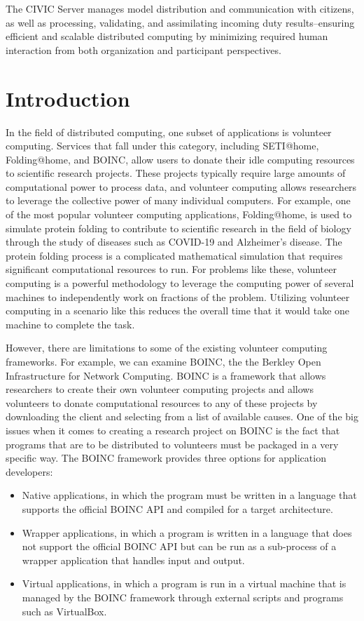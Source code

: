 \documentclass[11pt]{article}
\begin{document}
The CIVIC Server manages model distribution and communication with citizens, as well as processing, validating, and assimilating incoming duty results--ensuring efficient and scalable distributed computing by minimizing required human interaction from both organization and participant perspectives.


\section{Introduction}

In the field of distributed computing, one subset of applications is volunteer computing. Services that fall under this category, including SETI@home, Folding@home, and BOINC, allow users to donate their idle computing resources to scientific research projects. These projects typically require large amounts of computational power to process data, and volunteer computing allows researchers to leverage the collective power of many individual computers. For example, one of the most popular volunteer computing applications, Folding@home, is used to simulate protein folding to contribute to scientific research in the field of biology through the study of diseases such as COVID-19 and Alzheimer's disease. The protein folding process is a complicated mathematical simulation that requires significant computational resources to run. For problems like these, volunteer computing is a powerful methodology to leverage the computing power of several machines to independently work on fractions of the problem. Utilizing volunteer computing in a scenario like this reduces the overall time that it would take one machine to complete the task.

However, there are limitations to some of the existing volunteer computing frameworks. For example, we can examine BOINC, the the Berkley Open Infrastructure for Network Computing. BOINC is a framework that allows researchers to create their own volunteer computing projects and allows volunteers to donate computational resources to any of these projects by downloading the client and selecting from a list of available causes. One of the big issues when it comes to creating a research project on BOINC is the fact that programs that are to be distributed to volunteers must be packaged in a very specific way. The BOINC framework provides three options for application developers:

\begin{itemize}
    \item Native applications, in which the program must be written in a language that supports the official BOINC API and compiled for a target architecture.
    \item Wrapper applications, in which a program is written in a language that does not support the official BOINC API but can be run as a sub-process of a wrapper application that handles input and output.
    \item Virtual applications, in which a program is run in a virtual machine that is managed by the BOINC framework through external scripts and programs such as VirtualBox.
\end{itemize}
\end{document}
